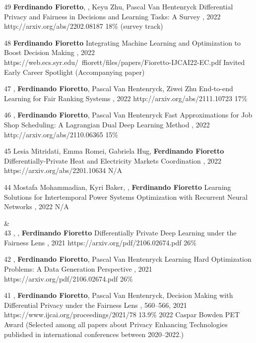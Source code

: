 \begin{pubs}
	\confentry
	{49} %
	{{\bf Ferdinando Fioretto}, , Keyu Zhu, Pascal Van Hentenryck}
	{Differential Privacy and Fairness in Decisions and Learning Tasks: A Survey}
	{\procIJCAI, 2022}
	{http://arxiv.org/abs/2202.08187}	
	{18\% (survey track)}

	\confentryAwd
	{48} %
	{{\bf Ferdinando Fioretto}}
	{Integrating Machine Learning and Optimization to Boost Decision Making}
	{\procIJCAI, 2022}
	{https://web.ecs.syr.edu/~ffiorett/files/papers/Fioretto-IJCAI22-EC.pdf}	
	{Invited}
	{Early Career Spotlight}
	{(Accompanying paper)}

	\confentry
	{47} %
	{, {\bf Ferdinando Fioretto}, Pascal Van Hentenryck, Ziwei Zhu}
	{End-to-end Learning for Fair Ranking Systems}
	{\procWWW, 2022}
	{http://arxiv.org/abs/2111.10723}	
	{17\%}
	
	\confentry
	{46} %
	{, {\bf Ferdinando Fioretto}, Pascal Van Hentenryck}
	{Fast Approximations for Job Shop Scheduling: A Lagrangian Dual Deep Learning Method}
	{\procAAAI, 2022}
	{http://arxiv.org/abs/2110.06365}
	{15\%}

	\confentry
	{45} %
	{Lesia Mitridati, Emma Romei, Gabriela Hug, {\bf Ferdinando Fioretto}}
	{Differentially-Private Heat and Electricity Markets Coordination}
	{\procPMAPS, 2022}
	{https://arxiv.org/abs/2201.10634}
	{N/A}
 
	\confentry
	{44} %
	{Mostafa Mohammadian, Kyri Baker, , {\bf Ferdinando Fioretto}}
	{Learning Solutions for Intertemporal Power Systems Optimization with Recurrent Neural Networks}
	{\procPMAPS, 2022}
	{N/A}


{}&\nemph{\rule{0.5\linewidth}{0.5pt}}\\[1em]

	\confentry 
	{43} %
	{, , {\bf Ferdinando Fioretto}}
	{Differentially Private Deep Learning under the Fairness Lens}
	{\procNeurIPS, 2021}
	{https://arxiv.org/pdf/2106.02674.pdf}
	{26\%} %

	\confentry 
	{42} %
	{, {\bf Ferdinando Fioretto}, Pascal Van Hentenryck}
	{Learning Hard Optimization Problems: A Data Generation Perspective}
	{\procNeurIPS, 2021}
	{https://arxiv.org/pdf/2106.02674.pdf}
	{26\%} %

	\confentryAwd 
	{41} %
	{, {\bf Ferdinando Fioretto}, Pascal Van Hentenryck, }
	{Decision Making with Differential Privacy under the Fairness Lens}
	{\procIJCAI, 560--566, 2021}
	{https://www.ijcai.org/proceedings/2021/78}
	{13.9\%} %
	{2022 Caspar Bowden PET Award}
	{(Selected among all papers about Privacy Enhancing Technologies published in international conferences between 2020--2022.)}


\end{pubs}

